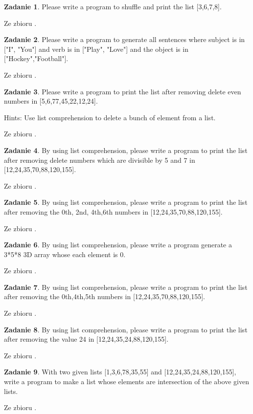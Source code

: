 \documentclass[11pt]{article}
\theoremstyle{definition}
\newtheorem{zadanie}{Zadanie}
\newcommand{\fromA}{\small Ze zbioru \cite{python100}.}
\begin{document}
\begin{zadanie}
Please write a program to shuffle and print the list [3,6,7,8].

\fromA
\end{zadanie}
\begin{zadanie}
Please write a program to generate all sentences where subject is in ["I", "You"] and verb is in ["Play", "Love"] and the object is in ["Hockey","Football"].

\fromA
\end{zadanie}
\begin{zadanie}
Please write a program to print the list after removing delete even numbers in [5,6,77,45,22,12,24].

Hints:
Use list comprehension to delete a bunch of element from a list.

\fromA
\end{zadanie}
\begin{zadanie}
By using list comprehension, please write a program to print the list after removing delete numbers which are divisible by 5 and 7 in [12,24,35,70,88,120,155].

\fromA
\end{zadanie}
\begin{zadanie}
By using list comprehension, please write a program to print the list after removing the 0th, 2nd, 4th,6th numbers in [12,24,35,70,88,120,155].

\fromA
\end{zadanie}
\begin{zadanie}
By using list comprehension, please write a program generate a 3*5*8 3D array whose each element is 0.

\fromA
\end{zadanie}
\begin{zadanie}
By using list comprehension, please write a program to print the list after removing the 0th,4th,5th numbers in [12,24,35,70,88,120,155].

\fromA
\end{zadanie}
\begin{zadanie}
By using list comprehension, please write a program to print the list after removing the value 24 in [12,24,35,24,88,120,155].

\fromA
\end{zadanie}
\begin{zadanie}
With two given lists [1,3,6,78,35,55] and [12,24,35,24,88,120,155], write a program to make a list whose elements are intersection of the above given lists.

\fromA
\end{zadanie}
\end{document}
